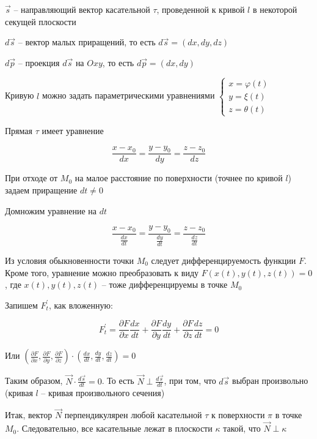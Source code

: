 \documentclass[12pt]{article}
\begin{document}
    \begin{MyProof}
        $\vec{s}$ -- направляющий вектор касательной $\tau$, проведенной к кривой $l$ в некоторой секущей плоскости

        $d \vec{s}$ -- вектор малых приращений, то есть $d \vec{s} = (dx, dy, dz)$

        $d \vec{p}$ -- проекция $d \vec{s}$ на $Oxy$, то есть $d \vec{p} = (dx, dy)$

        Кривую $l$ можно задать параметрическими уравнениями $\begin{cases}x = \varphi(t) \\ y = \xi(t) \\ z = \theta(t)\end{cases}$

        Прямая $\tau$ имеет уравнение

        \[\frac{x - x_0}{dx} = \frac{y - y_0}{dy} = \frac{z - z_0}{dz}\]

        При отходе от $M_0$ на малое расстояние по поверхности (точнее по кривой $l$) задаем приращение $dt \neq 0$

        Домножим уравнение на $dt$

        \[\frac{x - x_0}{\frac{dx}{dt}} = \frac{y - y_0}{\frac{dy}{dt}} = \frac{z - z_0}{\frac{dz}{dt}}\]

        Из условия обыкновенности точки $M_0$ следует дифференцируемость функции $F$.
        Кроме того, уравнение можно преобразовать к виду $F(x(t), y(t), z(t)) = 0$, где $x(t), y(t), z(t)$ -- тоже дифференцируемы в точке $M_0$

        Запишем $F^\prime_t$, как вложенную:

        \[F^\prime_t = \frac{\partial F}{\partial x}\frac{dx}{dt} + \frac{\partial F}{\partial y}\frac{dy}{dt} + \frac{\partial F}{\partial z}\frac{dz}{dt} = 0\]

        Или $\left(\frac{\partial F}{\partial x}, \frac{\partial F}{\partial y}, \frac{\partial F}{\partial z}\right) \cdot \left(\frac{dx}{dt}, \frac{dy}{dt}, \frac{dz}{dt}\right) = 0$

        Таким образом, $\vec{N} \cdot \frac{d\vec{s}}{dt} = 0$. То есть $\vec{N} \perp \frac{d\vec{s}}{dt}$, при том, что $d\vec{s}$ выбран произвольно (кривая $l$ -- кривая произвольного сечения)

        Итак, вектор $\vec{N}$ перпендикулярен любой касательной $\tau$ к поверхности $\pi$ в точке $M_0$.
        Следовательно, все касательные лежат в плоскости $\kappa$ такой, что $\vec{N} \perp \kappa$
    \end{MyProof}
\end{document}
